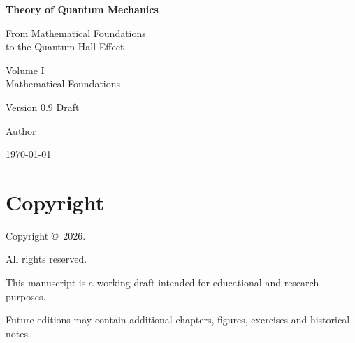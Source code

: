 \documentclass[11pt,a4paper,openany]{book}
\newcounter{exercise}[chapter]
\begin{document}

\begin{titlepage}
	
	\centering
	
	\vspace*{2cm}
	
	{\Huge\bfseries Theory of Quantum Mechanics\par}
	
	\vspace{0.8cm}
	
	{\Large From Mathematical Foundations\\[0.2cm]
		to the Quantum Hall Effect\par}
	
	\vspace{1cm}
	
	{\Large Volume I\\
		Mathematical Foundations\par}
	
	\vspace{2cm}
	
	Version 0.9 Draft
	
	\vfill
	
	Author
	
	\vspace{0.5cm}
	
	\today
	
\end{titlepage}


\cleardoublepage

\thispagestyle{empty}

\section*{Copyright}

Copyright \copyright\ 2026.

All rights reserved.

This manuscript is a working draft intended for educational and research
purposes.

Future editions may contain additional chapters, figures, exercises and
historical notes.
\end{document}

